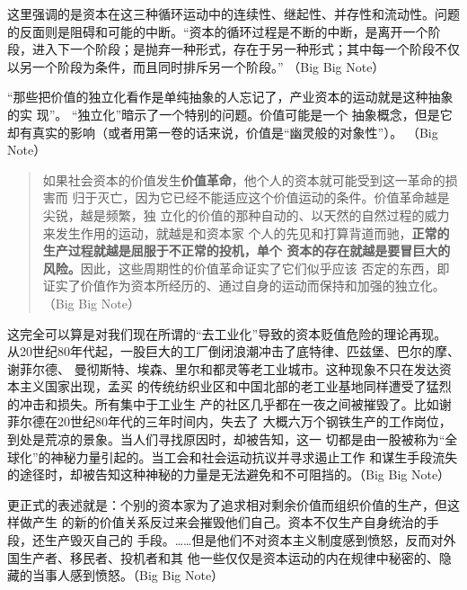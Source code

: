 这里强调的是资本在这三种循环运动中的连续性、继起性、并存性和流动性。问题的反面则是阻碍和可能的中断。“资本的循环过程是不断的中断，是离开一个阶段，进入下一个阶段；是抛弃一种形式，存在于另一种形式；其中每一个阶段不仅以另一个阶段为条件，而且同时排斥另一个阶段。” （Big Big Note）

“那些把价值的独立化看作是单纯抽象的人忘记了，产业资本的运动就是这种抽象的实
现”。 “独立化”暗示了一个特别的问题。价值可能是一个
抽象概念，但是它却有真实的影响（或者用第一卷的话来说，价值是“幽灵般的对象性”）。
（Big Note）

\begin{quotation}
  如果社会资本的价值发生\textbf{价值革命}，他个人的资本就可能受到这一革命的损害而
  归于灭亡，因为它已经不能适应这个价值运动的条件。价值革命越是尖锐，越是频繁，独
  立化的价值的那种自动的、以天然的自然过程的威力来发生作用的运动，就越是和资本家
  个人的先见和打算背道而驰，\textbf{正常的生产过程就越是屈服于不正常的投机，单个
    资本的存在就越是要冒巨大的风险。}因此，这些周期性的价值革命证实了它们似乎应该
  否定的东西，即证实了价值作为资本所经历的、通过自身的运动而保持和加强的独立化。（Big Big Note）

\end{quotation}

这完全可以算是对我们现在所谓的“去工业化”导致的资本贬值危险的理论再现。
从20世纪80年代起，一股巨大的工厂倒闭浪潮冲击了底特律、匹兹堡、巴尔的摩、谢菲尔德、
曼彻斯特、埃森、里尔和都灵等老工业城市。这种现象不只在发达资本主义国家出现，孟买
的传统纺织业区和中国北部的老工业基地同样遭受了猛烈的冲击和损失。所有集中于工业生
产的社区几乎都在一夜之间被摧毁了。比如谢菲尔德在20世纪80年代的三年时间内，失去了
大概六万个钢铁生产的工作岗位，到处是荒凉的景象。当人们寻找原因时，却被告知，这一
切都是由一股被称为“全球化”的神秘力量引起的。当工会和社会运动抗议并寻求遏止工作
和谋生手段流失的途径时，却被告知这种神秘的力量是无法避免和不可阻挡的。（Big Big Note）

更正式的表述就是：个别的资本家为了追求相对剩余价值而组织价值的生产，但这样做产生
的新的价值关系反过来会摧毁他们自己。资本不仅生产自身统治的手段，还生产毁灭自己的
手段。……但是他们不对资本主义制度感到愤怒，反而对外国生产者、移民者、投机者和其
他一些仅仅是资本运动的内在规律中秘密的、隐藏的当事人感到愤怒。（Big Big Note）

